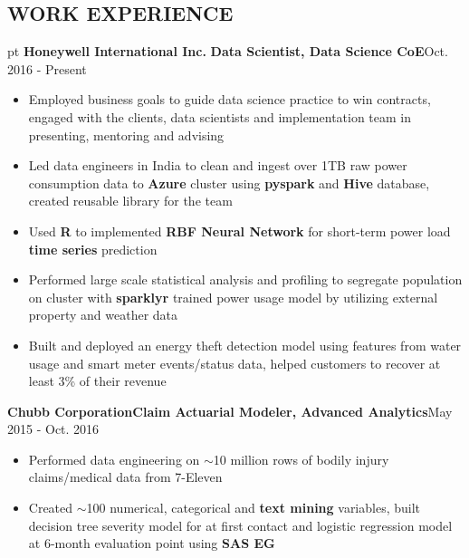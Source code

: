 \documentclass[10.5pt]{res} %
\begin{document}
\begin{resume}
\section{WORK EXPERIENCE}  pt
	\textbf{Honeywell International Inc.} \quad\quad\textbf{Data Scientist, Data Science CoE}\hfill Oct. 2016 - Present
		\begin{itemize}
			\item Employed business goals to guide data science practice to win contracts, engaged with the clients, data scientists and implementation team in presenting, mentoring and advising 
			\item Led data engineers in India to clean and ingest over 1TB raw power consumption data to \textbf{Azure} cluster using \textbf{pyspark} and \textbf{Hive} database, created reusable library for the team
			\item Used \textbf{R} to implemented \textbf{RBF Neural Network}  for short-term power load \textbf{time series} prediction     
			\item Performed large scale statistical analysis and profiling to segregate population on cluster with \textbf{sparklyr} trained power usage model by utilizing external property and weather data
			\item Built and deployed an energy theft detection model using features from water usage and smart meter events/status data, helped customers to recover at least 3\% of their revenue  
		\end{itemize}\vspace{-\topsep}
	\textbf{Chubb Corporation}\quad \textbf{Claim Actuarial Modeler, Advanced Analytics}\hfill May 2015 - Oct. 2016
		\begin{itemize}  pt
			\item Performed data engineering on $\sim$10 million rows of bodily injury claims/medical data from 7-Eleven  
			\item Created $\sim$100 numerical, categorical and \textbf{text mining} variables, built {decision tree} severity model for at first contact and {logistic regression} model at 6-month evaluation point using \textbf{SAS EG} %

\end{itemize}
\end{resume}
\end{document}
